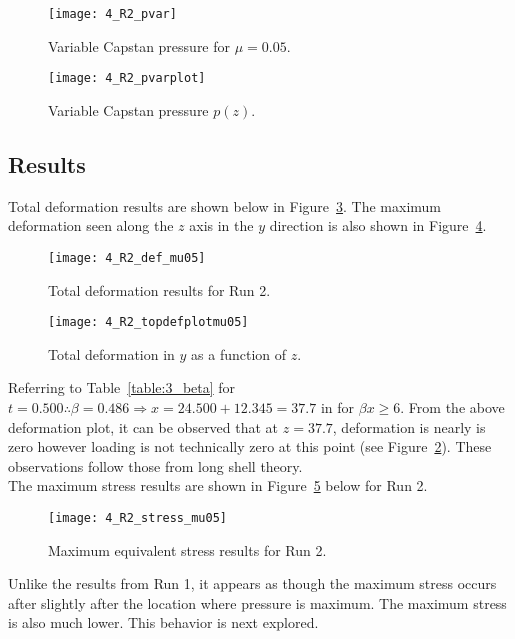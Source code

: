 \begin{figure}[H]
	\centering
	\texttt{[image: 4\_R2\_pvar]}
	\caption{Variable Capstan pressure for $\mu=0.05$.}
	\label{fig:4_R2_pvar}
\end{figure}
\begin{figure}[H]
	\centering
	\texttt{[image: 4\_R2\_pvarplot]}
	\caption{Variable Capstan pressure $p(z)$.}
	\label{fig:4_R2_pvarplot}
\end{figure}

\subsection{Results}

Total deformation results are shown below in Figure~\ref{fig:4_R2_def_mu05}. The maximum deformation seen along the $z$ axis in the $y$ direction is also shown in Figure~\ref{fig:4_R2_topdefplotmu05}.

\begin{figure}[H]
	\centering
 	\texttt{[image: 4\_R2\_def\_mu05]}
 	\caption{Total deformation results for Run 2.}
 	\label{fig:4_R2_def_mu05}
 \end{figure}
 
 \begin{figure}[H]
 	\centering
 \texttt{[image: 4\_R2\_topdefplotmu05]}
 	\caption{Total deformation in $y$ as a function of $z$.}
 	\label{fig:4_R2_topdefplotmu05}
 \end{figure}
 
Referring to Table~\ref{table:3_beta} for $t=0.500 \therefore \beta = 0.486 \Rightarrow x= 24.500+12.345 = 37.7$ in for $\beta x \geq 6$. From the above deformation plot, it can be observed that at $z=37.7$, deformation is nearly is zero however loading is not technically zero at this point (see Figure~\ref{fig:4_R2_pvarplot}). These observations follow those from long shell theory.\\

The maximum stress results are shown in Figure~\ref{fig:4_R2_stress_mu05} below for Run 2.

\begin{figure}[H]
	\centering
	\texttt{[image: 4\_R2\_stress\_mu05]}
	\caption{Maximum equivalent stress results for Run 2.}
	\label{fig:4_R2_stress_mu05}
\end{figure}

Unlike the results from Run 1, it appears as though the maximum stress occurs after slightly after the location where pressure is maximum. The maximum stress is also much lower. This behavior is next explored.

